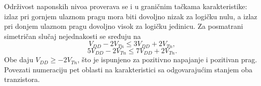 Održivost naponskih nivoa proverava se i u graničnim tačkama karakteristike: izlaz pri gornjem ulaznom pragu mora biti dovoljno nizak za logičku nulu, a izlaz pri donjem ulaznom pragu dovoljno visok za logičku jedinicu. Za posmatrani simetričan slučaj nejednakosti se sređuju na
\[V_{DD}-2V_{Tn}\leq3V_{DD}+2V_{Tn},\]
\[5V_{DD}-2V_{Tn}\leq7V_{DD}+2V_{Tn}.\]
Obe daju $V_{DD}\geq-2V_{Tn}$, što je ispunjeno za pozitivno napajanje i pozitivan prag. Povezati numeraciju pet oblasti na karakteristici sa odgovarajućim stanjem oba tranzistora.
